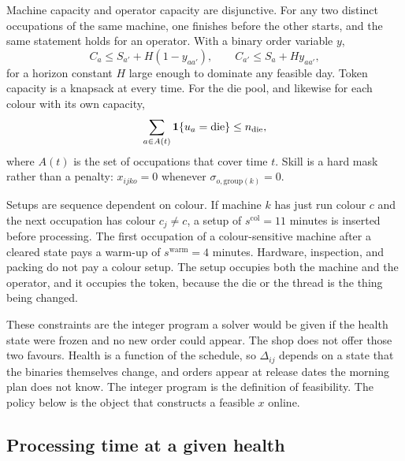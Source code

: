 Machine capacity and operator capacity are disjunctive. For any two distinct occupations of the same machine, one finishes before the other starts, and the same statement holds for an operator. With a binary order variable \(y\),
\begin{equation}
C_{a} \le S_{a'} + H(1-y_{aa'}) , \qquad C_{a'} \le S_{a} + H y_{aa'} ,
\label{eq:disjunct}
\end{equation}
for a horizon constant \(H\) large enough to dominate any feasible day. Token capacity is a knapsack at every time. For the die pool, and likewise for each colour with its own capacity,
\begin{equation}
\sum_{a \in A(t)} \mathbf{1}\{u_a = \mathrm{die}\} \le n_{\mathrm{die}} ,
\label{eq:token}
\end{equation}
where \(A(t)\) is the set of occupations that cover time \(t\). Skill is a hard mask rather than a penalty: \(x_{ijko} = 0\) whenever \(\sigma_{o,\mathrm{group}(k)} = 0\).

Setups are sequence dependent on colour. If machine \(k\) has just run colour \(c\) and the next occupation has colour \(c_j \ne c\), a setup of \(s^{\mathrm{col}} = 11\) minutes is inserted before processing. The first occupation of a colour-sensitive machine after a cleared state pays a warm-up of \(s^{\mathrm{warm}} = 4\) minutes. Hardware, inspection, and packing do not pay a colour setup. The setup occupies both the machine and the operator, and it occupies the token, because the die or the thread is the thing being changed.

These constraints are the integer program a solver would be given if the health state were frozen and no new order could appear. The shop does not offer those two favours. Health is a function of the schedule, so \(\Delta_{ij}\) depends on a state that the binaries themselves change, and orders appear at release dates the morning plan does not know. The integer program is the definition of feasibility. The policy below is the object that constructs a feasible \(x\) online.

\subsection{Processing time at a given health}

